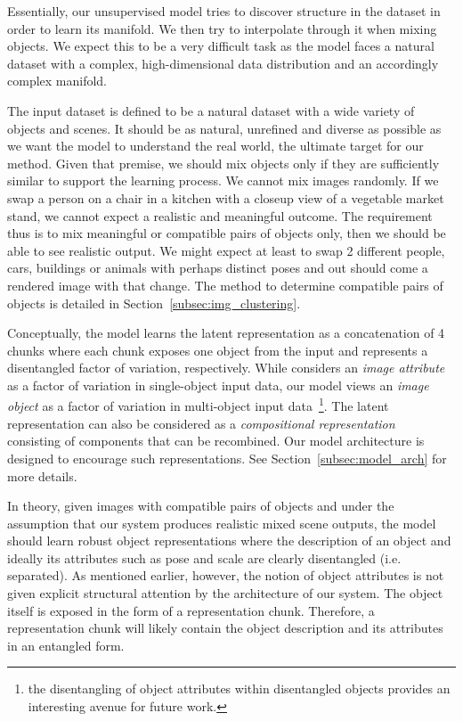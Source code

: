 \documentclass[a4paper,12pt]{report}
\begin{document}
Essentially, our unsupervised model tries to discover structure in the dataset in order to learn its manifold. We then try to interpolate through it when mixing objects. We expect this to be a very difficult task as the model faces a natural dataset with a complex, high-dimensional data distribution and an accordingly complex manifold. 

The input dataset is defined to be a natural dataset with a wide variety of objects and scenes. It should be as natural, unrefined and diverse as possible as we want the model to understand the real world, the ultimate target for our method. Given that premise, we should mix objects only if they are sufficiently similar to support the learning process. We cannot mix images randomly. If we swap a person on a chair in a kitchen with a closeup view of a vegetable market stand, we cannot expect a realistic and meaningful outcome. The requirement thus is to mix meaningful or compatible pairs of objects only, then we should be able to see realistic output. We might expect at least to swap 2 different people, cars, buildings or animals with perhaps distinct poses and out should come a rendered image with that change. The method to determine compatible pairs of objects is detailed in Section~\ref{subsec:img_clustering}. 

Conceptually, the model learns the latent representation as a concatenation of 4 chunks where each chunk exposes one object from the input and represents a disentangled factor of variation, respectively. While \cite{DisentFacOfVarByMixTh} considers an \textit{image attribute} as a factor of variation in single-object input data, our model views an \textit{image object} as a factor of variation in multi-object input data~\footnote{the disentangling of object attributes within disentangled objects provides an interesting avenue for future work.}. The latent representation can also be considered as a \textit{compositional representation}~\cite{SpatialBDecoder} consisting of components that can be recombined. %
Our model architecture is designed to encourage such representations. See Section~\ref{subsec:model_arch} for more details. 

In theory, given images with compatible pairs of objects and under the assumption that our system produces realistic mixed scene outputs, the model should learn robust object representations where the description of an object and ideally its attributes such as pose and scale are clearly disentangled (i.e. separated). As mentioned earlier, however, the notion of object attributes is not given explicit structural attention by the architecture of our system. The object itself is exposed in the form of a representation chunk. Therefore, a representation chunk will likely contain the object description and its attributes in an entangled form.
\end{document}
